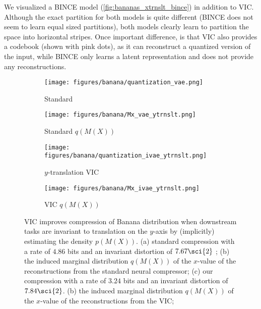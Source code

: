 \documentclass[final]{article}
\begin{document}
We visualized a BINCE model (\cref{fig:bananas_xtrnslt_bince}) in addition to VIC.
Although the exact partition for both models is quite different (BINCE does not seem to learn equal sized partitions), both models clearly learn to partition the space into horizontal stripes.
Once important difference, is that VIC also provides a codebook (shown with pink dots), as it can reconstruct a quantized version of the input, while BINCE only learns a latent representation and does not provide any reconstructions.

\begin{figure}[h]
     \centering
     \begin{subfigure}[h]{0.24\columnwidth}
         \centering
         \texttt{[image: figures/banana/quantization\_vae.png]}
         \caption{Standard}
         \label{fig:bananas_ytrnslt_vae}
     \end{subfigure}
     \hfill
     \begin{subfigure}[h]{0.24\columnwidth}
         \centering
         \texttt{[image: figures/banana/Mx\_vae\_ytrnslt.png]}
         \caption{Standard $q(M(X))$}
         \label{fig:bananas_ytrnslt_vae_Mx}
     \end{subfigure}
     \hfill
     \begin{subfigure}[h]{0.24\columnwidth}
         \centering
         \texttt{[image: figures/banana/quantization\_ivae\_ytrnslt.png]}
         \caption{$y$-translation VIC}
         \label{fig:bananas_ytrnslt_ivae}
     \end{subfigure}
     \hfill
     \begin{subfigure}[h]{0.24\columnwidth}
         \centering
         \texttt{[image: figures/banana/Mx\_ivae\_ytrnslt.png]}
         \caption{VIC $q(M(X))$}
         \label{fig:bananas_ytrnslt_ivae_Mx}
     \end{subfigure}
\caption{
VIC improves compression of Banana distribution when downstream tasks are invariant to translation on the $y$-axis by (implicitly) estimating the density $p(M(X))$.
(a) standard compression with a rate of $4.86$ bits and an invariant distortion of $7.67\sci{2}$ ; 
(b) the induced marginal distribution $q(M(X))$ of the $x$-value of the reconstructions from the standard neural compressor;
(c) our compression with a rate of $3.24$ bits and an invariant distortion of $7.84\sci{2}$.
(b) the induced marginal distribution $q(M(X))$ of the $x$-value of the reconstructions from the VIC;
}
\label{fig:bananas_ytrnslt}
\vspace{-0.5em}
\end{figure} 
\end{document}
